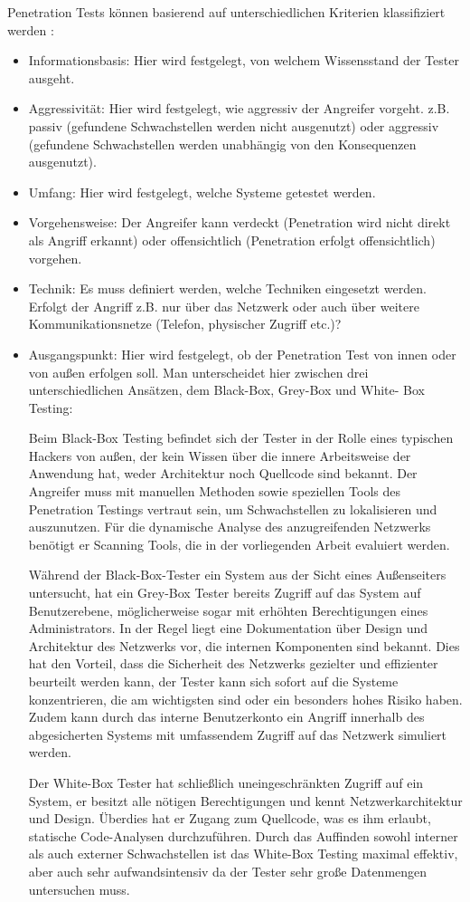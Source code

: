\documentclass[12pt,oneside,a4paper,parskip,pointlessnumbers]{scrbook}
\begin{document}
    Penetration Tests können basierend auf unterschiedlichen Kriterien klassifiziert werden \cite{BSI}:
    \begin{itemize}
      \item Informationsbasis: Hier wird festgelegt, von welchem Wissensstand der Tester ausgeht.
      \item Aggressivität: Hier wird festgelegt, wie aggressiv der Angreifer vorgeht. z.B. passiv (gefundene
      Schwachstellen werden nicht ausgenutzt) oder aggressiv (gefundene Schwachstellen werden
      unabhängig von den Konsequenzen ausgenutzt).
      \item Umfang: Hier wird festgelegt, welche Systeme getestet werden.
      \item Vorgehensweise: Der Angreifer kann verdeckt (Penetration wird nicht direkt als Angriff erkannt)
      oder offensichtlich (Penetration erfolgt offensichtlich) vorgehen.
      \item Technik: Es muss definiert werden, welche Techniken eingesetzt werden. Erfolgt der Angriff z.B. nur
      über das Netzwerk oder auch über weitere Kommunikationsnetze (Telefon, physischer Zugriff etc.)?
      \item Ausgangspunkt: Hier wird festgelegt, ob der Penetration Test von innen oder von außen erfolgen
      soll. Man unterscheidet hier zwischen drei unterschiedlichen Ansätzen, dem Black-Box, Grey-Box und White- Box Testing:

    Beim Black-Box Testing befindet sich der Tester in der Rolle eines typischen Hackers von
    außen, der kein Wissen über die innere Arbeitsweise der Anwendung hat, weder Architektur noch
    Quellcode sind bekannt. Der Angreifer muss mit manuellen Methoden sowie speziellen Tools des Penetration Testings vertraut sein, um Schwachstellen zu lokalisieren und auszunutzen. Für die dynamische Analyse des anzugreifenden Netzwerks benötigt er Scanning Tools, die in der vorliegenden Arbeit evaluiert werden.

    Während der Black-Box-Tester ein System aus der Sicht eines Außenseiters untersucht, hat ein    Grey-Box Tester bereits Zugriff auf das System auf Benutzerebene, möglicherweise sogar mit erhöhten Berechtigungen eines Administrators. In der Regel liegt eine Dokumentation über Design und Architektur des Netzwerks vor, die internen Komponenten sind bekannt. Dies hat den Vorteil, dass die Sicherheit des Netzwerks gezielter und effizienter beurteilt werden kann, der Tester kann sich sofort auf die Systeme konzentrieren, die am wichtigsten sind oder ein besonders hohes Risiko haben. Zudem kann durch das interne Benutzerkonto ein Angriff innerhalb des abgesicherten Systems mit umfassendem Zugriff auf das Netzwerk simuliert werden.

    Der White-Box Tester hat schließlich uneingeschränkten Zugriff auf ein System, er besitzt alle nötigen Berechtigungen und kennt Netzwerkarchitektur und Design. Überdies hat er Zugang zum Quellcode, was es ihm erlaubt, statische Code-Analysen durchzuführen. Durch das Auffinden sowohl interner als auch externer Schwachstellen ist das White-Box Testing maximal effektiv, aber auch sehr aufwandsintensiv da der Tester sehr große Datenmengen untersuchen muss.
    \end{itemize}
\end{document}
